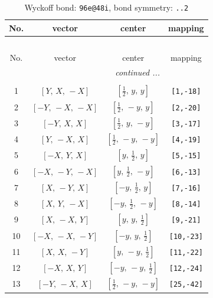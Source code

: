 \documentclass[fleqn,8pt]{jsarticle}
\begin{document}
\begin{longtable}{cccc}
\caption{Wyckoff bond: {\tt 96e@48i}, bond symmetry: {\tt ..2}}
 \\
 \hline \hline
No. & vector & center & mapping \\ \hline \endfirsthead

\multicolumn{3}{l}{\tablename\ \thetable{}} \\
 \hline \hline
No. & vector & center & mapping \\ \hline \endhead

 \hline \hline
\multicolumn{3}{r}{\footnotesize\it continued ...} \\ \endfoot

 \hline \hline
\multicolumn{3}{r}{} \\ \endlastfoot

1 & $\left[ Y,\, X,\, - X \right]$ & $\left[ \frac{1}{2},\, y,\, y \right]$ & {\tt [1,-18]} \\ \hline
2 & $\left[ - Y,\, - X,\, - X \right]$ & $\left[ \frac{1}{2},\, - y,\, y \right]$ & {\tt [2,-20]} \\ \hline
3 & $\left[ - Y,\, X,\, X \right]$ & $\left[ \frac{1}{2},\, y,\, - y \right]$ & {\tt [3,-17]} \\ \hline
4 & $\left[ Y,\, - X,\, X \right]$ & $\left[ \frac{1}{2},\, - y,\, - y \right]$ & {\tt [4,-19]} \\ \hline
5 & $\left[ - X,\, Y,\, X \right]$ & $\left[ y,\, \frac{1}{2},\, y \right]$ & {\tt [5,-15]} \\ \hline
6 & $\left[ - X,\, - Y,\, - X \right]$ & $\left[ y,\, \frac{1}{2},\, - y \right]$ & {\tt [6,-13]} \\ \hline
7 & $\left[ X,\, - Y,\, X \right]$ & $\left[ - y,\, \frac{1}{2},\, y \right]$ & {\tt [7,-16]} \\ \hline
8 & $\left[ X,\, Y,\, - X \right]$ & $\left[ - y,\, \frac{1}{2},\, - y \right]$ & {\tt [8,-14]} \\ \hline
9 & $\left[ X,\, - X,\, Y \right]$ & $\left[ y,\, y,\, \frac{1}{2} \right]$ & {\tt [9,-21]} \\ \hline
10 & $\left[ - X,\, - X,\, - Y \right]$ & $\left[ - y,\, y,\, \frac{1}{2} \right]$ & {\tt [10,-23]} \\ \hline
11 & $\left[ X,\, X,\, - Y \right]$ & $\left[ y,\, - y,\, \frac{1}{2} \right]$ & {\tt [11,-22]} \\ \hline
12 & $\left[ - X,\, X,\, Y \right]$ & $\left[ - y,\, - y,\, \frac{1}{2} \right]$ & {\tt [12,-24]} \\ \hline
13 & $\left[ - Y,\, - X,\, X \right]$ & $\left[ \frac{1}{2},\, - y,\, - y \right]$ & {\tt [25,-42]} \\ \hline

\end{longtable}
\end{document}
